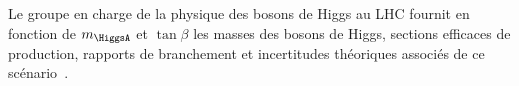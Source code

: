 \par
Le groupe en charge de la physique des bosons de Higgs au LHC
fournit en fonction de $m_{\HiggsA}$ et $\tan\beta$
les masses des bosons de Higgs, sections efficaces de production, rapports de branchement et incertitudes théoriques
associés de ce scénario~\cite{MSSMneutralHiggsTwiki}.
%
